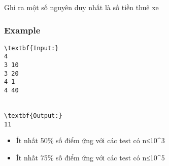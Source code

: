    Ghi ra một số nguyên duy nhất là số tiền thuê xe  

\subsubsection{   Example  }
\begin{verbatim}
\textbf{Input:}
4
3 10
3 20
4 1
4 40


\textbf{Output:}
11 \end{verbatim}
\begin{itemize}
	\item     Ít nhất 50\% số điểm ứng với các test có n≤10\textasciicircum3   
	\item     Ít nhất 75\% số điểm ứng với các test có n≤10\textasciicircum5   
\end{itemize}